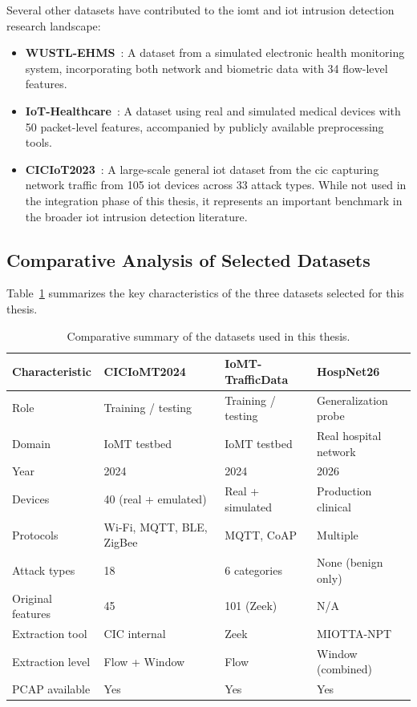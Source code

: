 Several other datasets have contributed to the \gls{iomt} and \gls{iot} intrusion detection research landscape:

\begin{itemize}
    \item \textbf{WUSTL-EHMS}~\cite{hady2020ids}: A dataset from a simulated electronic health monitoring system, incorporating both network and biometric data with 34 flow-level features.

    \item \textbf{IoT-Healthcare}~\cite{hussain2021framework}: A dataset using real and simulated medical devices with 50 packet-level features, accompanied by publicly available preprocessing tools.

    \item \textbf{CICIoT2023}~\cite{neto2023ciciot2023}: A large-scale general \gls{iot} dataset from the \gls{cic} capturing network traffic from 105 \gls{iot} devices across 33 attack types. While not used in the integration phase of this thesis, it represents an important benchmark in the broader \gls{iot} intrusion detection literature.
\end{itemize}

\subsection{Comparative Analysis of Selected Datasets}
\label{subsec:dataset-comparison}

Table~\ref{tab:dataset-comparison} summarizes the key characteristics of the three datasets selected for this thesis.

\begin{table}[htbp]
\centering
\caption{Comparative summary of the datasets used in this thesis.}
\label{tab:dataset-comparison}
\small
\begin{tabularx}{\textwidth}{@{}l X X X@{}}
\toprule
\textbf{Characteristic} & \textbf{CICIoMT2024} & \textbf{IoMT-TrafficData} & \textbf{HospNet26} \\
\midrule
Role & Training / testing & Training / testing & Generalization probe \\
Domain & IoMT testbed & IoMT testbed & Real hospital network \\
Year & 2024 & 2024 & 2026 \\
Devices & 40 (real + emulated) & Real + simulated & Production clinical \\
Protocols & Wi-Fi, MQTT, BLE, ZigBee & MQTT, CoAP & Multiple \\
Attack types & 18 & 6 categories & None (benign only) \\
Original features & 45 & 101 (Zeek) & N/A \\
Extraction tool & CIC internal & Zeek & MIOTTA-NPT \\
Extraction level & Flow + Window & Flow & Window (combined) \\
PCAP available & Yes & Yes & Yes \\
\bottomrule
\end{tabularx}
\end{table}


